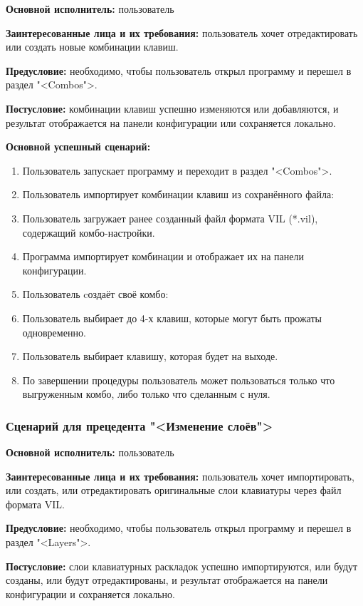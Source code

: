 \textbf{Основной исполнитель:} пользователь

\textbf{Заинтересованные лица и их требования:} пользователь хочет отредактировать или создать новые комбинации клавиш.

\textbf{Предусловие:} необходимо, чтобы пользователь открыл программу и перешел в раздел "<Combos">.

\textbf{Постусловие:} комбинации клавиш успешно изменяются или добавляются, и результат отображается на панели конфигурации или сохраняется локально.

\textbf{Основной успешный сценарий:}

\begin{enumerate}
\item Пользователь запускает программу и переходит в раздел "<Combos">.
\item[2.1. ] Пользователь импортирует комбинации клавиш из сохранённого файла:
\item[2.1.1. ] Пользователь загружает ранее созданный файл формата VIL (*.vil), содержащий комбо-настройки.
\item[2.1.2. ] Программа импортирует комбинации и отображает их на панели конфигурации.
\item[2.2. ] Пользователь cоздаёт своё комбо:
\item[2.2.1. ] Пользователь выбирает до 4-х клавиш, которые могут быть прожаты одновременно.
\item[2.2.2. ] Пользователь выбирает клавишу, которая будет на выходе.
\item[3. ] По завершении процедуры пользователь может пользоваться только что выгруженным комбо, либо только что сделанным с нуля.
\end{enumerate}

\subsubsection{Сценарий для прецедента "<Изменение слоёв">}

\textbf{Основной исполнитель:} пользователь

\textbf{Заинтересованные лица и их требования:} пользователь хочет импортировать, или создать, или отредактировать оригинальные слои клавиатуры через файл формата VIL.

\textbf{Предусловие:} необходимо, чтобы пользователь открыл программу и перешел в раздел "<Layers">.

\textbf{Постусловие:} слои клавиатурных раскладок успешно импортируются, или будут созданы, или будут отредактированы, и результат отображается на панели конфигурации и сохраняется локально.


